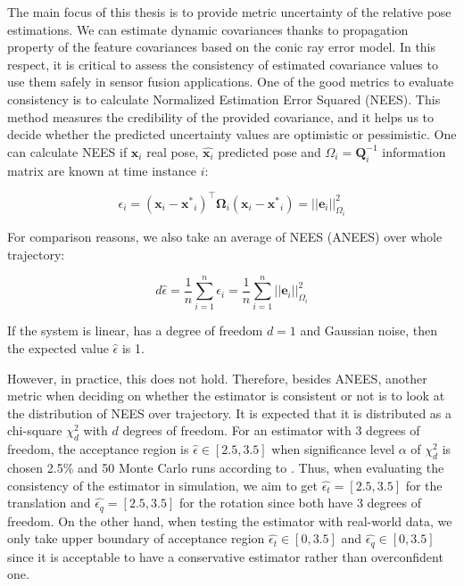 \documentclass[12pt]{report}
\numberwithin{figure}{section}
\begin{document}
The main focus of this thesis is to provide metric uncertainty of the relative pose estimations. We can estimate dynamic covariances thanks to propagation property of the feature covariances based on the conic ray error model. In this respect, it is critical to assess the consistency of estimated covariance values to use them safely in sensor fusion applications.  One of the good metrics to evaluate consistency is to calculate Normalized Estimation Error Squared (NEES). This method measures the credibility of the provided covariance, and it helps us to decide whether the predicted uncertainty values are optimistic or pessimistic.  One can calculate NEES if $\mathbf{x}_i$ real pose, $\hat{\mathbf{x}_i}$ predicted pose and $\Omega_i = \mathbf{Q}_i^{-1}$ information matrix are known at time instance $i$:

\begin{equation}
  \epsilon_i = (\mathbf{x}_i - \mathbf{x^*}_i)^\top \mathbf{\Omega}_i 
  (\mathbf{x}_i - \mathbf{x^*}_i) 
  = ||\mathbf{e}_i||^2_{\Omega_i}
\end{equation}


For comparison reasons, we also take an average of NEES (ANEES) over whole trajectory:

\begin{equation}
  d \hat{\epsilon} =  \frac{1}{n} \sum_{i=1}^{n} \epsilon_i = 
  \frac{1}{n} \sum_{i=1}^{n} ||\mathbf{e}_i||^2_{\Omega_i}
\end{equation}

If the system is linear, has a degree of freedom $d=1$ and Gaussian noise, 
then the expected value 
$\hat{\epsilon}$ is 1. 

However, in practice, this does not hold. Therefore, besides ANEES, another 
metric when deciding on whether the estimator is consistent or not is to look 
at the distribution of NEES over trajectory.  It is expected that it is 
distributed as a chi-square $\chi_d^2$ with $d$ degrees of freedom.  For an 
estimator with 3 degrees of freedom, the acceptance region is $\hat{\epsilon} 
\in 
[2.5,3.5]$ when significance level $\alpha$ of $\chi_d^2$ is chosen 2.5\% and 
50 Monte Carlo runs according to \parencite[see][234--235]{Shalom2001}.  Thus, 
when evaluating the consistency of the estimator in simulation, we aim to get 
$\hat{\epsilon_t}=[2.5,3.5]$ for the translation and 
$\hat{\epsilon_q}=[2.5,3.5]$ for the rotation since both have 3 degrees of 
freedom. On the other hand, when testing the estimator with real-world data, 
we only take upper boundary of acceptance region $\hat{\epsilon_t} \in [0, 
3.5]$ and $\hat{\epsilon_q} \in [0, 3.5]$ since it is acceptable to have a 
conservative estimator rather than overconfident one.
\end{document}
